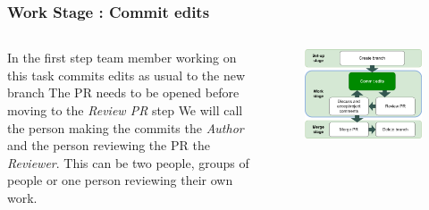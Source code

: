 \documentclass[aspectratio=169]{beamer} %
\begin{document}
\begin{frame}
	\frametitle{Work Stage : Commit edits}
	\begin{columns}[c]
		
		
		\normalsize
		In the first step team member working on this task
		commits edits as usual to the new branch 
		\vspace{.5cm}\newline
		The PR needs to be opened before moving to the \textit{Review PR} step
		\vspace{.5cm}\newline
		We will call the person making the commits the \textit{Author} and the person reviewing the PR the \textit{Reviewer}. This can be two people, groups of people or one person reviewing their own work.
		
		\vspace{-.75cm}
		\begin{figure}
			\centering
			\includegraphics[width=\textwidth]{./img/branch-pr-merge-cycle-S2a.png}
		\end{figure}
		
	\end{columns}
\end{frame}
\end{document}
